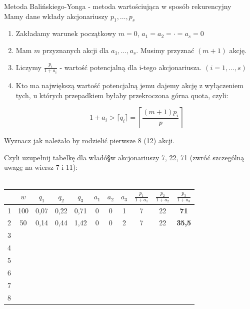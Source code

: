 \documentclass[12pt,a4paper]{article}
\theoremstyle{break}
\begin{document}
	\begin{zad}
		Metoda Balińskiego-Yonga - metoda wartościująca w sposób rekurencyjny\\
		
		Mamy dane wkłady akcjonariuszy $p_1,\dots,p_s$\\
		
		\begin{enumerate}[1.]
			\item Zakładamy warunek początkowy $m=0$, $a_1=a_2=\cdot=a_s=0$
			\item Mam $m$ przyznanych akcji dla $a_1,\dots,a_s$. Musimy przyznać $(m+1)$ akcję.
			\item Liczymy $\frac{p_i}{1+a_i}$ - wartość potencjalną dla i-tego akcjonariusza. $(i=1,\dots,s)$
			\item Kto ma największą wartość potencjalną jemu dajemy akcję z wyłączeniem tych, u których przepadkiem byłaby przekroczona górna quota, czyli:
			
			$$~ 1+a_i > \lceil q_i \rceil = \left\lceil \frac{(m+1)p_i}{p}\right\rceil$$ 
		\end{enumerate}
	
	Wyznacz jak należało by rodzielić pierwsze 8 (12) akcji.
	\end{zad}

	Czyli uzupełnij tabelkę dla władó§w akcjonariuszy 7, 22, 71  (zwróć szczególną uwagę na wiersz 7 i 11):\\\\
	
	\begin{center}
		\begin{tabular}{||c||c||c|c|c||c|c|c||c|c|c||}\hline
		&\Large$w$&\Large$q_1$&\Large$q_2$&\Large$q_3$&\Large$a_1$&\Large$a_2$&\Large$a_3$&\Large$\frac{p_1}{1+a_1}$&\Large$\frac{p_2}{1+a_2}$&\Large$\frac{p_3}{1+a_3}$\\\hline
		1&100&0,07&0,22&0,71&0&0&1&7&22&\textbf{71}\\\hline
		2&50&0,14&0,44&1,42&0&0&2&7&22&\textbf{35,5}\\\hline
		3&&&&&&&&&&\\\hline
		4&&&&&&&&&&\\\hline
		5&&&&&&&&&&\\\hline
		6&&&&&&&&&&\\\hline
		7&&&&&&&&&&\\\hline
		8&&&&&&&&&&\\\hline
	\end{tabular}
	\end{center}
\end{document}
